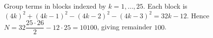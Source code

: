 Group terms in blocks indexed by $k=1,\ldots,25$. Each block is $(4k)^2+(4k-1)^2-(4k-2)^2-(4k-3)^2=32k-12$. Hence $N=32\dfrac{25\cdot 26}{2}-12\cdot 25=10100$, giving remainder $\boxed{100}$.
